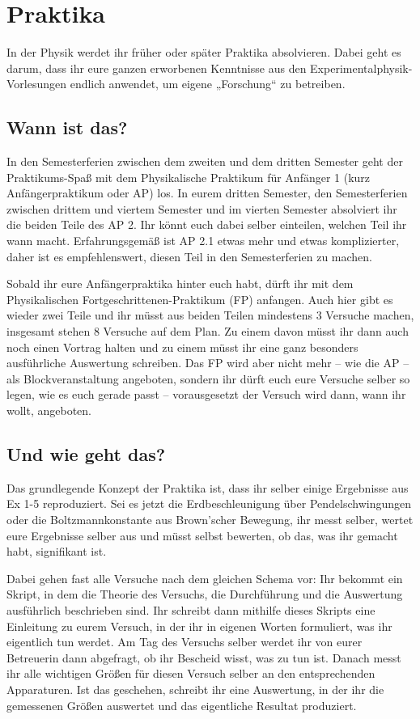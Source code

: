 \section{Praktika}

In der Physik werdet ihr früher oder später Praktika absolvieren. Dabei geht es darum, dass ihr eure ganzen erworbenen Kenntnisse aus den Experimentalphysik-Vorlesungen endlich anwendet, um eigene „Forschung“ zu betreiben.


\subsection{Wann ist das?}
In den Semesterferien zwischen dem zweiten und dem dritten Semester geht der Praktikums-Spaß mit dem Physikalische Praktikum für Anfänger 1 (kurz Anfängerpraktikum oder \gls{AP}) los. In eurem dritten Semester, den Semesterferien zwischen drittem und viertem Semester und im vierten Semester absolviert ihr die beiden Teile des AP 2. Ihr könnt euch dabei selber einteilen, welchen Teil ihr wann macht. Erfahrungsgemäß ist AP 2.1 etwas mehr und etwas komplizierter, daher ist es empfehlenswert, diesen Teil in den Semesterferien zu machen.

Sobald ihr eure Anfängerpraktika hinter euch habt, dürft ihr mit dem Physikalischen Fortgeschrittenen-Praktikum (\gls{FP}) anfangen. Auch hier gibt es wieder zwei Teile und ihr müsst aus beiden Teilen mindestens 3 Versuche machen, insgesamt stehen 8 Versuche auf dem Plan. Zu einem davon müsst ihr dann auch noch einen Vortrag halten und zu einem müsst ihr eine ganz besonders ausführliche Auswertung schreiben. Das FP wird aber nicht mehr -- wie die AP -- als Blockveranstaltung angeboten, sondern ihr dürft euch eure Versuche selber so legen, wie es euch gerade passt -- vorausgesetzt der Versuch wird dann, wann ihr wollt, angeboten.

\subsection{Und wie geht das?}
Das grundlegende Konzept der Praktika ist, dass ihr selber einige Ergebnisse aus Ex 1-5 reproduziert. Sei es jetzt die Erdbeschleunigung über Pendelschwingungen oder die Boltzmannkonstante aus Brown'scher Bewegung, ihr messt selber, wertet eure Ergebnisse selber aus und müsst selbst bewerten, ob das, was ihr gemacht habt, signifikant ist.

Dabei gehen fast alle Versuche nach dem gleichen Schema vor: Ihr bekommt ein Skript, in dem die Theorie des Versuchs, die Durchführung und die Auswertung ausführlich beschrieben sind. Ihr schreibt dann mithilfe dieses Skripts eine Einleitung zu eurem Versuch, in der ihr in eigenen Worten formuliert, was ihr eigentlich tun werdet. Am Tag des Versuchs selber werdet ihr von eurer Betreuerin dann abgefragt, ob ihr Bescheid wisst, was zu tun ist. Danach messt ihr alle wichtigen Größen für diesen Versuch selber an den entsprechenden Apparaturen. Ist das geschehen, schreibt ihr eine Auswertung, in der ihr die gemessenen Größen auswertet und das eigentliche Resultat produziert.
